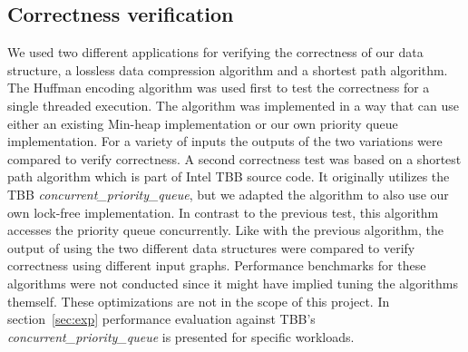 \subsection{Correctness verification}
\label{subsec:corr_ver}
We used two different applications for verifying the correctness of our data structure, a lossless data compression algorithm and a shortest path algorithm. 
The Huffman encoding algorithm was used first to test the correctness for a single threaded execution. The algorithm was implemented in a way that can use either an existing Min-heap implementation or our own priority queue implementation. For a variety of inputs the outputs of the two variations were compared to verify correctness.
A second correctness test was based on a shortest path algorithm which is part of Intel TBB source code. It originally utilizes the TBB \textit{concurrent\_priority\_queue}, but we adapted the algorithm to also use our own lock-free implementation. In contrast to the previous test, this algorithm accesses the priority queue concurrently. Like with the previous algorithm, the output of using the two different data structures were compared to verify correctness using different input graphs. Performance benchmarks for these algorithms were not conducted since it might have implied tuning the algorithms themself. These optimizations are not in the scope of this project. In section~\ref{sec:exp} performance evaluation against TBB's \textit{concurrent\_priority\_queue} is presented for specific workloads.

